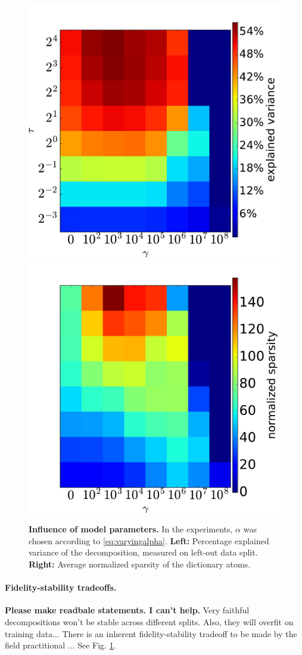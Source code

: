 \begin{figure}[!htbp]
  \includegraphics[width=.45\linewidth]{figures/heat_LANGUAGE_1.pdf}
  \includegraphics[width=.45\linewidth]{figures/sparsity.pdf}
  \caption{\textbf{Influence of model parameters.} %
In the experiments, $\alpha$ was chosen according to \eqref{eq:varyingalpha}. \textbf{Left:} Percentage explained variance of the decomposition, measured on left-out data split.
    \textbf{Right: }%
    Average normalized sparsity of the dictionary atoms. %
  }
  \label{fig:param}
\end{figure}

\paragraph*{Fidelity-stability tradeoffs.}
\textbf{Please make readbale statements. I can't help.}
Very faithful decompositions won't be stable across different splits. Also,
they will overfit on training data... There is an inherent fidelity-stability tradeoff to be made by the field practitional   \citep{abraham2013}
... See Fig. \ref{fig:param}.

